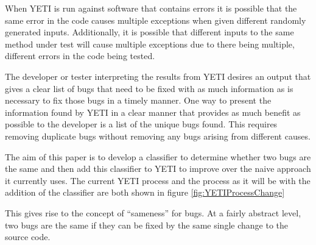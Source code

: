 \documentclass[authoryearcitations]{UoYCSproject}
\begin{document}
When YETI is run against software that contains errors it is possible that the same error in the code causes multiple exceptions when given different randomly generated inputs. Additionally, it is possible that different inputs to the same method under test will cause multiple exceptions due to there being multiple, different errors in the code being tested.

The developer or tester interpreting the results from YETI desires an output that gives a clear list of bugs that need to be fixed with as much information as is necessary to fix those bugs in a timely manner. One way to present the information found by YETI in a clear manner that provides as much benefit as possible to the developer is a list of the unique bugs found. This requires removing duplicate bugs without removing any bugs arising from different causes.

The aim of this paper is to develop a classifier to determine whether two bugs are the same and then add this classifier to YETI to improve over the naive approach it currently uses. The current YETI process and the process as it will be with the addition of the classifier are both shown in figure \ref{fig:YETIProcessChange}

This gives rise to the concept of ``sameness'' for bugs. At a fairly abstract level, two bugs are the same if they can be fixed by the same single change to the source code.
\end{document}

